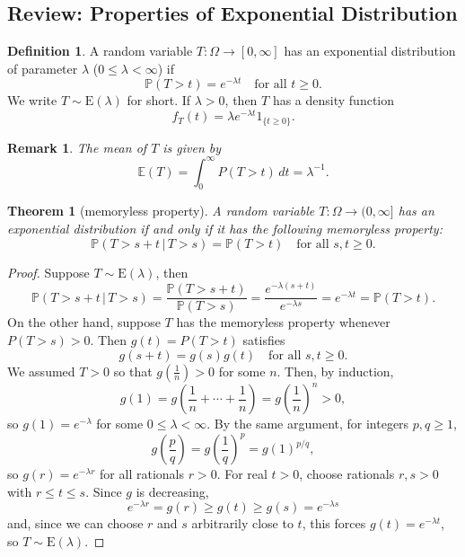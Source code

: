 \documentclass{article}
\newtheorem{Thm}{Theorem}[section]
\newtheorem*{Rk}{Remark}
\theoremstyle{definition}
\newtheorem{Def}{Definition}[section]
\newcommand{\PP}{\mathbb{P}}
\renewcommand{\leq}{\leqslant}
\renewcommand{\geq}{\geqslant}
\newcommand{\<}{\left\langle}
\renewcommand{\>}{\right\rangle}
\begin{document}
\subsection{Review: Properties of Exponential Distribution}
\begin{Def}
    A random variable \(T : \Omega \to [0,\infty]\) has an exponential distribution of parameter \(\lambda\) (\(0 \leq \lambda < \infty\)) if
\[
\mathbb{P}(T > t) = e^{-\lambda t} \quad \text{for all } t \geq 0.
\]
We write \(T \sim \text{E}(\lambda)\) for short. If \(\lambda > 0\), then \(T\) has a density function
\[
f_T(t) = \lambda e^{-\lambda t} 1_{\{t \geq 0\}}.
\]
\end{Def}
\begin{Rk}
    The mean of \(T\) is given by
\[
\mathbb{E}(T) = \int_{0}^{\infty} P(T > t) \, dt = \lambda^{-1}.
\]

\end{Rk}

\begin{Thm}[memoryless property]
    A random variable \(T : \Omega \to (0,\infty]\) has an exponential distribution if and only if it has the following memoryless property:
\[
\PP(T > s + t \,|\, T > s) = \PP(T > t) \quad \text{for all } s, t \geq 0.
\]
\end{Thm}
\begin{proof}
    Suppose \(T \sim \text{E}(\lambda)\), then
\[
\PP(T > s + t \,|\, T > s) = \frac{\PP(T > s + t)}{ \PP(T > s)} = \frac{e^{-\lambda(s+t)}}{e^{-\lambda s}} = e^{-\lambda t} = \PP(T > t).
\]
On the other hand, suppose \(T\) has the memoryless property whenever \(P(T > s) > 0\). Then \(g(t) = P(T > t)\) satisfies
\[
g(s + t) = g(s)g(t) \quad \text{for all } s, t \geq 0.
\]
We assumed \(T > 0\) so that \(g\left(\frac{1}{n}\right) > 0\) for some \(n\). Then, by induction,
\[
g(1) = g(\frac{1}{n}+\cdots+\frac{1}{n})=g\left(\frac{1}{n}\right)^n > 0,
\]
so \(g(1) = e^{-\lambda}\) for some \(0 \leq \lambda < \infty\). By the same argument, for integers \(p, q \geq 1\),
\[
g\left(\frac{p}{q}\right) = g\left(\frac{1}{q}\right)^p = g(1)^{p/q},
\]
so \(g(r) = e^{-\lambda r}\) for all rationals \(r > 0\). For real \(t > 0\), choose rationals \(r, s > 0\) with \(r \leq t \leq s\). Since \(g\) is decreasing,
\[
e^{-\lambda r} = g(r) \geq g(t) \geq g(s) = e^{-\lambda s}
\]
and, since we can choose \(r\) and \(s\) arbitrarily close to \(t\), this forces \(g(t) = e^{-\lambda t}\), so \(T \sim \text{E}(\lambda)\).

\end{proof}
\end{document}
